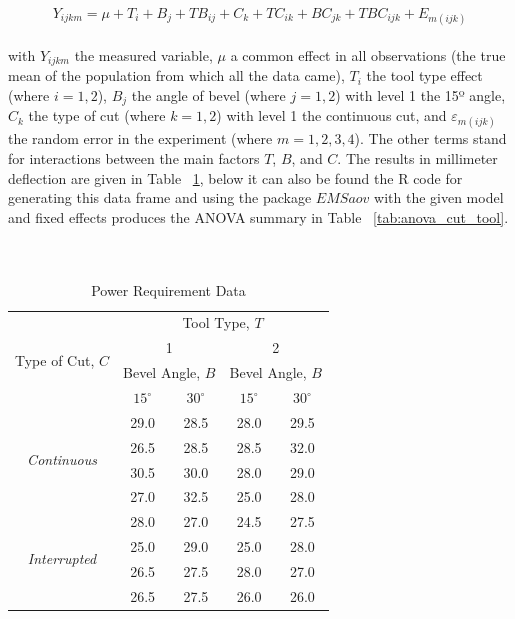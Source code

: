 \documentclass{WileySev}
\begin{document}
\begin{equation}
Y_{ijkm}=\mu+T_i+B_j+TB_{ij}+C_k+TC_{ik}+BC_{jk}+TBC_{ijk}+E_{m(ijk)}
\end{equation}
\\
with $Y_{ijkm}$ the measured variable, $\mu$ a common effect in all observations (the true mean of the population from which all the data came), $T_i$ the tool type effect (where $i = 1, 2$), $B_j$ the angle of bevel (where $j = 1, 2$) with level 1 the 15º angle, $C_k$ the type of cut (where $k = 1, 2$) with level 1 the continuous cut, and $\varepsilon_{m(ijk)}$ the random error in the experiment (where $m = 1, 2, 3, 4$). The other terms stand for interactions between the main factors $T$, $B$, and $C$. The results in millimeter deflection are given in Table ~\ref{tab:cut_tool}, below it can also be found the R code for generating this data frame and using the package $EMSaov$ with the given model and fixed effects produces the ANOVA summary in Table ~\ref{tab:anova_cut_tool}.
\\
\\
\\
\begin{table}[h]
\caption{Power Requirement Data}
\centering
\begin{tabular}{ |c|cccc| }
\hline
\multirow{4}{*}{Type of Cut, $C$} & \multicolumn{4}{c|}{Tool Type, $T$} \\
 & \multicolumn{2}{c}{1} & \multicolumn{2}{c|}{2} \\
 \cline{2-5}
 & \multicolumn{2}{c}{Bevel Angle, $B$} & \multicolumn{2}{c|}{Bevel Angle, $B$} \\
 & $15^{\circ}$ & $30^{\circ}$ & $15^{\circ}$ & $30^{\circ}$ \\
 \hline
 \multirow{4}{*}{\textit{Continuous}} & 29.0 & 28.5 & 28.0 & 29.5 \\
 & 26.5 & 28.5 & 28.5 & 32.0 \\
 & 30.5 & 30.0 & 28.0 & 29.0 \\
 & 27.0 & 32.5 & 25.0 & 28.0 \\
\hline
\multirow{4}{*}{\textit{Interrupted}} & 28.0 & 27.0 & 24.5 & 27.5 \\
 & 25.0 & 29.0 & 25.0 & 28.0 \\
 & 26.5 & 27.5 & 28.0 & 27.0 \\
 & 26.5 & 27.5 & 26.0 & 26.0 \\
\hline
\end{tabular}
\label{tab:cut_tool}
\end{table}
\end{document}
